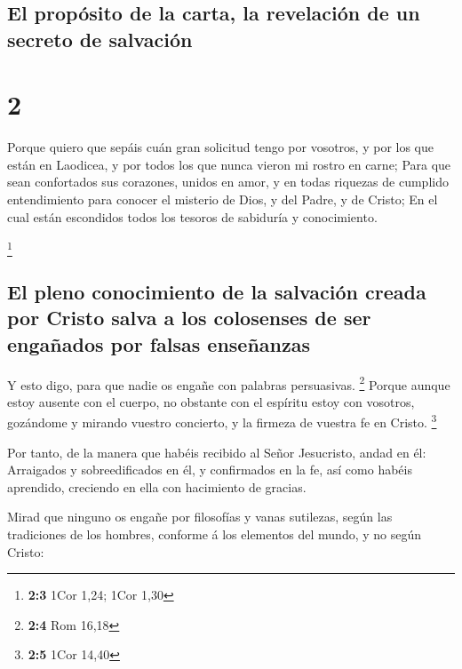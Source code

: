 \hypertarget{el-propuxf3sito-de-la-carta-la-revelaciuxf3n-de-un-secreto-de-salvaciuxf3n}{%
\subsection{El propósito de la carta, la revelación de un secreto de
salvación}\label{el-propuxf3sito-de-la-carta-la-revelaciuxf3n-de-un-secreto-de-salvaciuxf3n}}

\hypertarget{section-1}{%
\section{2}\label{section-1}}

 Porque quiero que sepáis cuán gran solicitud tengo por
vosotros, y por los que están en Laodicea, y por todos los que nunca
vieron mi rostro en carne;  Para que sean confortados sus
corazones, unidos en amor, y en todas riquezas de cumplido entendimiento
para conocer el misterio de Dios, y del Padre, y de Cristo;
 En el cual están escondidos todos los tesoros de
sabiduría y conocimiento.

\footnote{\textbf{2:3} 1Cor 1,24; 1Cor 1,30}

\hypertarget{el-pleno-conocimiento-de-la-salvaciuxf3n-creada-por-cristo-salva-a-los-colosenses-de-ser-engauxf1ados-por-falsas-enseuxf1anzas}{%
\subsection{El pleno conocimiento de la salvación creada por Cristo
salva a los colosenses de ser engañados por falsas
enseñanzas}\label{el-pleno-conocimiento-de-la-salvaciuxf3n-creada-por-cristo-salva-a-los-colosenses-de-ser-engauxf1ados-por-falsas-enseuxf1anzas}}

 Y esto digo, para que nadie os engañe con palabras
persuasivas. \footnote{\textbf{2:4} Rom 16,18}  Porque
aunque estoy ausente con el cuerpo, no obstante con el espíritu estoy
con vosotros, gozándome y mirando vuestro concierto, y la firmeza de
vuestra fe en Cristo. \footnote{\textbf{2:5} 1Cor 14,40}

 Por tanto, de la manera que habéis recibido al Señor
Jesucristo, andad en él:  Arraigados y sobreedificados en
él, y confirmados en la fe, así como habéis aprendido, creciendo en ella
con hacimiento de gracias.

 Mirad que ninguno os engañe por filosofías y vanas
sutilezas, según las tradiciones de los hombres, conforme á los
elementos del mundo, y no según Cristo:

